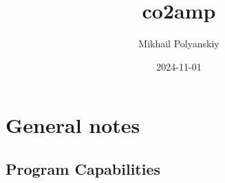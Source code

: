 \documentclass{report}
\begin{document}
\title{co2amp}
\author{Mikhail Polyanskiy}

\date{2024-11-01}
\maketitle

\tableofcontents

\chapter{General notes}

\section{Program Capabilities}
\end{document}
